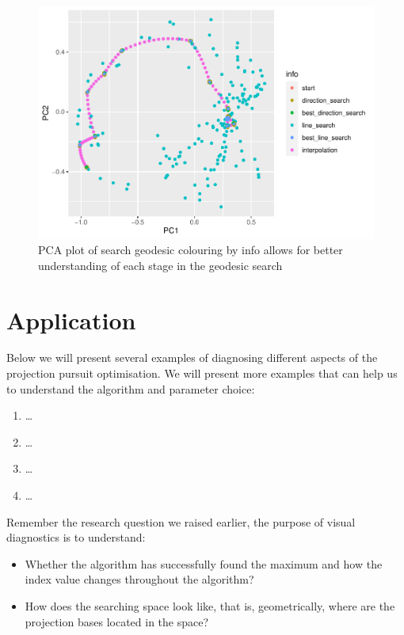 \documentclass[12pt]{article}
\providecommand{\tightlist}{%
  \setlength{\itemsep}{0pt}\setlength{\parskip}{0pt}}
\begin{document}
\begin{figure}
\centering
\includegraphics{paper_files/figure-latex/pca-1.pdf}
\caption{\label{pca}PCA plot of search geodesic colouring by info allows
for better understanding of each stage in the geodesic search}
\end{figure}

\newpage

\hypertarget{application}{%
\section{Application}\label{application}}

Below we will present several examples of diagnosing different aspects
of the projection pursuit optimisation. We will present more examples
that can help us to understand the algorithm and parameter choice:

\begin{enumerate}
\def\labelenumi{\arabic{enumi})}
\tightlist
\item
  \ldots{}
\item
  \ldots{}
\item
  \ldots{}
\item
  \ldots{}
\end{enumerate}

Remember the research question we raised earlier, the purpose of visual
diagnostics is to understand:

\begin{itemize}
\item
  Whether the algorithm has successfully found the maximum and how the
  index value changes throughout the algorithm?
\item
  How does the searching space look like, that is, geometrically, where
  are the projection bases located in the space?
\end{itemize}
\end{document}
